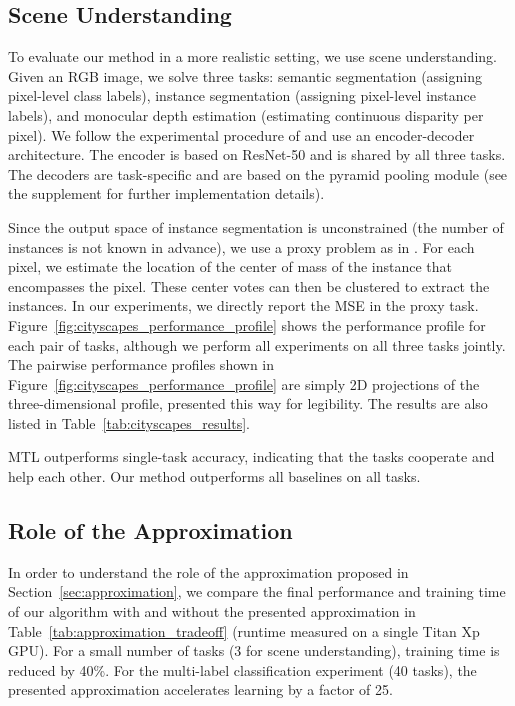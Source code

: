 \documentclass{article}
\begin{document}
\subsection{Scene Understanding}

To evaluate our method in a more realistic setting, we use scene understanding. Given an RGB image, we solve three tasks: semantic segmentation (assigning pixel-level class labels), instance segmentation (assigning pixel-level instance labels), and monocular depth estimation (estimating continuous disparity per pixel). We follow the experimental procedure of \citet{Kendall2018} and use an encoder-decoder architecture. The encoder is based on ResNet-50 \citep{resnet} and is shared by all three tasks. The decoders are task-specific and are based on the pyramid pooling module \citep{pspnet} (see the supplement for further implementation details).

Since the output space of instance segmentation is unconstrained (the number of instances is not known in advance), we use a proxy problem as in \citet{Kendall2018}. For each pixel, we estimate the location of the center of mass of the instance that encompasses the pixel. These center votes can then be clustered to extract the instances. In our experiments, we directly report the MSE in the proxy task. Figure~\ref{fig:cityscapes_performance_profile} shows the performance profile for each pair of tasks, although we perform all experiments on all three tasks jointly. The pairwise performance profiles shown in Figure~\ref{fig:cityscapes_performance_profile} are simply 2D projections of the three-dimensional profile, presented this way for legibility. The results are also listed in Table~\ref{tab:cityscapes_results}.

MTL outperforms single-task accuracy, indicating that the tasks cooperate and help each other. Our method outperforms all baselines on all tasks.


\subsection{Role of the Approximation}

In order to understand the role of the approximation proposed in Section~\ref{sec:approximation}, we compare the final performance and training time of our algorithm with and without the presented approximation in Table~\ref{tab:approximation_tradeoff} (runtime measured on a single Titan Xp GPU). For a small number of tasks (3 for scene understanding), training time is reduced by 40\%. For the multi-label classification experiment (40 tasks), the presented approximation accelerates learning by a factor of 25.
\end{document}
